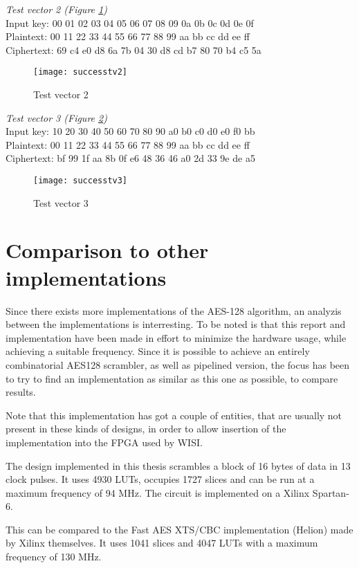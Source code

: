 \emph{Test vector 2 (Figure \ref{test:2})}\\
Input key: 00 01 02 03 04 05 06 07 08 09 0a 0b 0c 0d 0e 0f\\
Plaintext: 00 11 22 33 44 55 66 77 88 99 aa bb cc dd ee ff\\
Ciphertext: 69 c4 e0 d8 6a 7b 04 30 d8 cd b7 80 70 b4 c5 5a

\begin{figure}
  \texttt{[image: successtv2]}
  \caption{Test vector 2}
  \label{test:2}
\end{figure}

\emph{Test vector 3 (Figure \ref{test:3})} \\
Input key: 10 20 30 40 50 60 70 80 90 a0 b0 c0 d0 e0 f0 bb\\
Plaintext: 00 11 22 33 44 55 66 77 88 99 aa bb cc dd ee ff\\
Ciphertext: bf 99 1f aa 8b 0f e6 48 36 46 a0 2d 33 9e de a5

\begin{figure}
  \texttt{[image: successtv3]}
  \caption{Test vector 3}
  \label{test:3}
\end{figure}

\section{Comparison to other implementations}
Since there exists more implementations of the AES-128 algorithm, an 
analyzis between the implementations is interresting. To be noted is 
that this report and implementation have been made in effort to 
minimize the hardware usage, while achieving a suitable frequency.
Since it is possible to achieve an entirely combinatorial AES128 
scrambler, as well as pipelined version, the focus has been to try to 
find an implementation as similar as this one as possible, to compare 
results. 

Note that this implementation has got a couple of entities, that are 
usually not present in these kinds of designs, in order to allow 
insertion of the implementation into the FPGA used by WISI.

The design implemented in this thesis scrambles a block of 16 bytes 
of data in 13 clock pulses. It uses 4930 LUTs, occupies 1727 slices 
and can be run at a maximum frequency of 94 MHz. The circuit is 
implemented on a Xilinx Spartan-6.

This can be compared to the Fast AES XTS/CBC implementation (Helion) 
made by Xilinx themselves. It uses 1041 slices and 4047 LUTs with a 
maximum frequency of 130 MHz. \cite{Xilinx:AES} 

